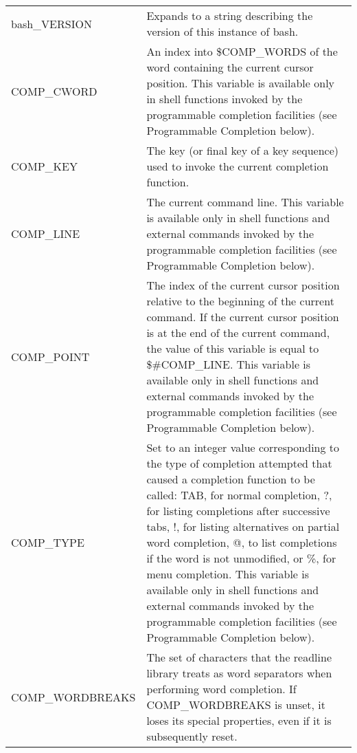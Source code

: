 \documentclass[11pt]{article}
\begin{document}
\begin{longtable}{p{}p{}}
bash\_VERSION &
Expands to a string describing the version of this instance of bash. \\

COMP\_CWORD &
An index into \${COMP\_WORDS} of the word containing the current cursor position. This variable is available only in shell functions invoked by the programmable completion facilities (see Programmable Completion below). \\

COMP\_KEY &
The key (or final key of a key sequence) used to invoke the current completion function. \\

COMP\_LINE &
The current command line. This variable is available only in shell functions and external commands invoked by the programmable completion facilities (see Programmable Completion below). \\

COMP\_POINT &
The index of the current cursor position relative to the beginning of the current command. If the current cursor position is at the end of the current command, the value of this variable is equal to \${\#COMP\_LINE}. This variable is available only in shell functions and external commands invoked by the programmable completion facilities (see Programmable Completion below). \\

COMP\_TYPE &
Set to an integer value corresponding to the type of completion attempted that caused a completion function to be called: TAB, for normal completion, ?, for listing completions after successive tabs, !, for listing alternatives on partial word completion, @, to list completions if the word is not unmodified, or \%, for menu completion. This variable is available only in shell functions and external commands invoked by the programmable completion facilities (see Programmable Completion below). \\

COMP\_WORDBREAKS &
The set of characters that the readline library treats as word separators when performing word completion. If COMP\_WORDBREAKS is unset, it loses its special properties, even if it is subsequently reset. \\


\end{longtable}
\end{document}
